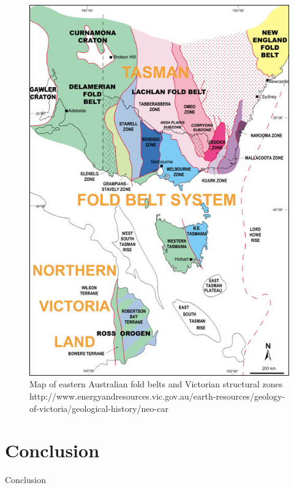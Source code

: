 \documentclass[a4paper]{article}
\begin{document}
\begin{figure}[H]
\centering
\includegraphics[width=1\textwidth]{Geology_Neoproterozoic_Fig_2.jpg}
\caption{\label{fig:
VicStructuralZones}Map of eastern Australian fold belts and Victorian structural zones http://www.energyandresources.vic.gov.au/earth-resources/geology-of-victoria/geological-history/neo-car}
\end{figure}
 



\section{Conclusion}

Conclusion


\newpage


\end{document}
